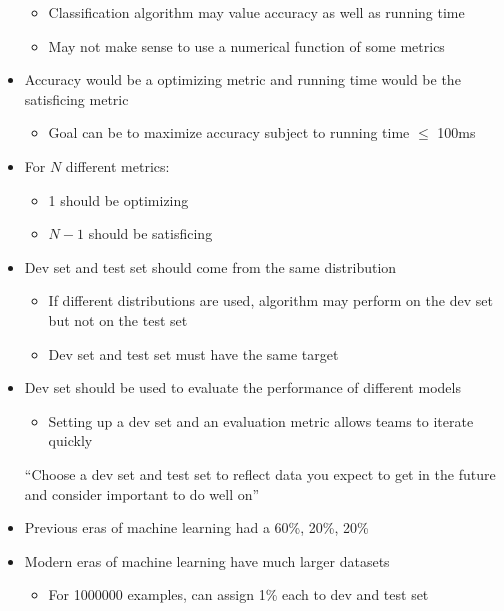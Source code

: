 \documentclass[12pt, letterpaper]{article}
\begin{document}
\begin{itemize}
\begin{itemize}
            \item Classification algorithm may value accuracy as well as running time
            \item May not make sense to use a numerical function of some metrics
        \end{itemize}
        \item Accuracy would be a optimizing metric and running time would be the satisficing metric
        \begin{itemize}
            \item Goal can be to maximize accuracy subject to running time $\leq$ 100ms
        \end{itemize}
        \item For $N$ different metrics:
        \begin{itemize}
            \item 1 should be optimizing
            \item $N-1$ should be satisficing
        \end{itemize}
        \item Dev set and test set should come from the same distribution
        \begin{itemize}
            \item If different distributions are used, algorithm may perform on the dev set but not on the test set 
            \item Dev set and test set must have the same target
        \end{itemize}
        \item Dev set should be used to evaluate the performance of different models
        \begin{itemize}
            \item Setting up a dev set and an evaluation metric allows teams to iterate quickly
        \end{itemize}
        \vspace{5mm}
        \begin{center}
            ``Choose a dev set and test set to reflect data you expect to get in the future and consider important to do well on''
        \end{center}
        \item Previous eras of machine learning had a 60\%, 20\%, 20\%
        \item Modern eras of machine learning have much larger datasets
        \begin{itemize}
            \item For 1000000 examples, can assign 1\% each to dev and test set

\end{itemize}
\end{itemize}
\end{document}
